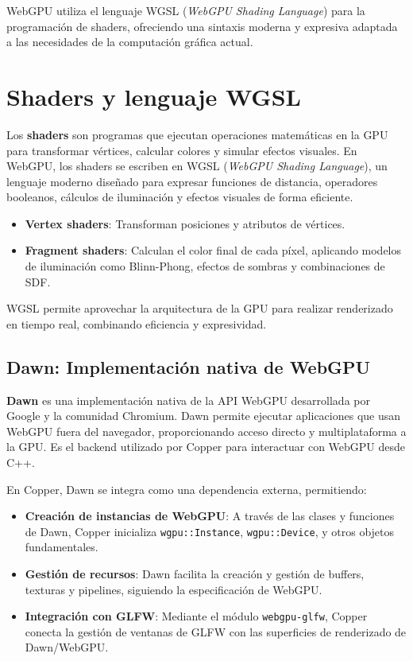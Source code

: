 WebGPU utiliza el lenguaje WGSL (\textit{WebGPU Shading Language}) para la
programación de shaders, ofreciendo una sintaxis moderna y expresiva adaptada a
las necesidades de la computación gráfica actual.

\section{Shaders y lenguaje WGSL}

Los \textbf{shaders} son programas que ejecutan operaciones matemáticas en la
GPU para transformar vértices, calcular colores y simular efectos visuales. En
WebGPU, los shaders se escriben en WGSL (\textit{WebGPU Shading Language}), un
lenguaje moderno diseñado para expresar funciones de distancia, operadores
booleanos, cálculos de iluminación y efectos visuales de forma eficiente.

\begin{itemize}
    \item \textbf{Vertex shaders}: Transforman posiciones y atributos de vértices.
    \item \textbf{Fragment shaders}: Calculan el color final de cada píxel, aplicando modelos de iluminación como Blinn-Phong, efectos de sombras y combinaciones de SDF.
\end{itemize}

WGSL permite aprovechar la arquitectura de la GPU para realizar renderizado en
tiempo real, combinando eficiencia y expresividad.

\subsection{Dawn: Implementación nativa de WebGPU}

\textbf{Dawn} es una implementación nativa de la API WebGPU desarrollada por Google y la comunidad Chromium\cite{dawn}. Dawn permite ejecutar aplicaciones que usan WebGPU fuera del navegador, proporcionando acceso directo y multiplataforma a la GPU. Es el backend utilizado por Copper para interactuar con WebGPU desde C++.

En Copper, Dawn se integra como una dependencia externa, permitiendo:

\begin{itemize}
    \item \textbf{Creación de instancias de WebGPU}: A través de las clases y funciones de Dawn, Copper inicializa \texttt{wgpu::Instance}, \texttt{wgpu::Device}, y otros objetos fundamentales.
    \item \textbf{Gestión de recursos}: Dawn facilita la creación y gestión de buffers, texturas y pipelines, siguiendo la especificación de WebGPU.
    \item \textbf{Integración con GLFW}: Mediante el módulo \texttt{webgpu-glfw}, Copper conecta la gestión de ventanas de GLFW con las superficies de renderizado de Dawn/WebGPU.
\end{itemize}

